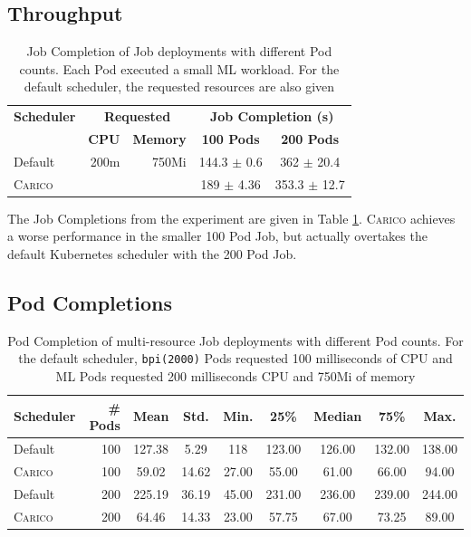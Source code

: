\subsection{Throughput}
\begin{table}[ht!]
\centering
    \begin{tabular}{|l|r|r|c|c|}
    \hline
    \textbf{Scheduler} & \multicolumn{2}{c|}{\textbf{Requested}} &
        \multicolumn{2}{c|}{\textbf{Job Completion (s)}} \\ \cline{2-5}
    &  \textbf{CPU} & \textbf{Memory} & \textbf{100 Pods} & \textbf{200 Pods} \\
    \hline
        Default & 200m & 750Mi & 144.3 $\pm$ 0.6 & 362 $\pm$ 20.4\\
        \textsc{Carico} &  &  & 189 $\pm$ 4.36 & 353.3 $\pm$ 12.7 \\
    \hline
    \end{tabular}
    \caption{Job Completion of Job deployments with different Pod counts. Each
    Pod executed a small ML workload. For the default scheduler, the requested
    resources are also given}
    \label{tab:ml-throughput}
\end{table}
The Job Completions from the experiment are given in Table
\ref{tab:ml-throughput}. \textsc{Carico} achieves a worse performance in the smaller 100
Pod Job, but actually overtakes the default Kubernetes scheduler with the 200
Pod Job.

\subsection{Pod Completions}
\begin{table}[ht!]
\centering
    \begin{tabular}{|l|r|c|c|c|c|c|c|c|}
    \hline
        \bfseries Scheduler & \bfseries \# Pods & \bfseries Mean & \bfseries Std. &
        \bfseries Min. & \bfseries 25\% & \bfseries Median & \bfseries 75\% & \bfseries Max. \\
    \hline
        Default & 100 & 127.38 & 5.29 & 118 & 123.00 & 126.00 & 132.00 &
        138.00 \\
        \textsc{Carico} & 100 & 59.02 & 14.62 & 27.00 & 55.00 & 61.00 & 66.00 & 94.00 \\
        Default & 200 & 225.19 & 36.19 & 45.00 & 231.00 & 236.00 & 239.00 &
        244.00\\
        \textsc{Carico} & 200 & 64.46 & 14.33 & 23.00 & 57.75 & 67.00 & 73.25 & 89.00 \\
    \hline
    \end{tabular}
    \caption{Pod Completion of multi-resource Job deployments with different Pod
    counts. For the default scheduler, \texttt{bpi(2000)} Pods requested 100
    milliseconds of CPU and ML Pods requested 200 milliseconds CPU and 750Mi of
    memory}
    \label{tab:mem-pod-completions}
\end{table}

